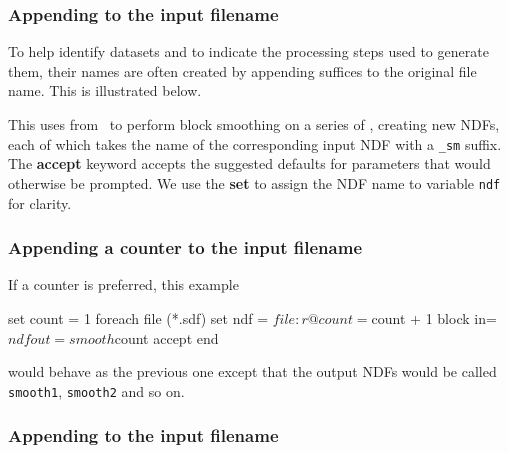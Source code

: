 \documentclass[twoside,11pt,nolof]{starlink}
\providecommand{\KAPPAref}{\xref{{\footnotesize KAPPA}}{sun95}{}}
\providecommand{\NDFrefa}[1]{\xref{#1}{sun33}{}}
\begin{document}
\subsubsection{Appending to the input
filename\label{sc4_se_append_filename}}

To help identify datasets and to indicate the processing steps used to
generate them, their names are often created by appending suffices to
the original file name.  This is illustrated below.

\begin{small}
\end{small}
This uses  from \KAPPAref\ to perform
block smoothing on a series of \NDFrefa{\textsf{NDF}s}, creating new NDFs,
each of which takes the name of the corresponding input NDF with a
\texttt{\_sm} suffix.  The \textbf{accept} keyword accepts the suggested
defaults for parameters that would otherwise be prompted.  We use the
\textbf{set} to assign the NDF name to variable \texttt{ndf} for clarity.

\subsubsection{Appending a counter to the input
filename\label{sc4_se_append_counter}}

If a counter is preferred, this example

\begin{small}
\begin{terminalv}
     set count = 1
     foreach file (*.sdf)
        set ndf = $file:r
        @ count = $count + 1
        block in=$ndf out=smooth$count accept
     end
\end{terminalv}
\end{small}
would behave as the previous one except that the output NDFs would be
called \texttt{smooth1}, \texttt{smooth2} and so on.

\subsubsection{Appending to the input
filename\label{sc4_se_filename_substitution}}
\end{document}
